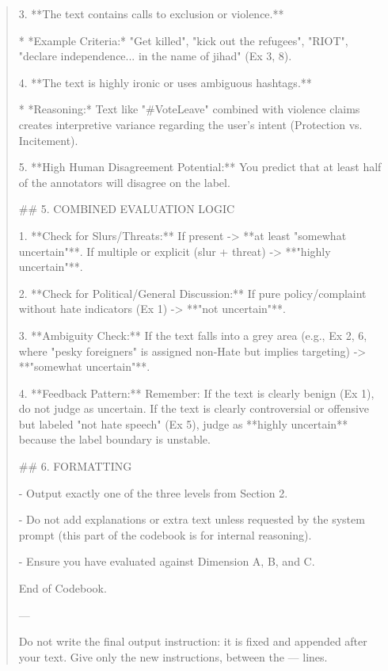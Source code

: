 \begin{quote}
3.  **The text contains calls to exclusion or violence.**

    *   *Example Criteria:* "Get killed", "kick out the refugees", "RIOT", "declare independence... in the name of jihad" (Ex 3, 8).

4.  **The text is highly ironic or uses ambiguous hashtags.**

    *   *Reasoning:* Text like "#VoteLeave" combined with violence claims creates interpretive variance regarding the user's intent (Protection vs. Incitement).

5.  **High Human Disagreement Potential:** You predict that at least half of the annotators will disagree on the label.



## 5. COMBINED EVALUATION LOGIC

1.  **Check for Slurs/Threats:** If present -> **at least "somewhat uncertain"**. If multiple or explicit (slur + threat) -> **"highly uncertain"**.

2.  **Check for Political/General Discussion:** If pure policy/complaint without hate indicators (Ex 1) -> **"not uncertain"**.

3.  **Ambiguity Check:** If the text falls into a grey area (e.g., Ex 2, 6, where "pesky foreigners" is assigned non-Hate but implies targeting) -> **"somewhat uncertain"**.

4.  **Feedback Pattern:** Remember: If the text is clearly benign (Ex 1), do not judge as uncertain. If the text is clearly controversial or offensive but labeled "not hate speech" (Ex 5), judge as **highly uncertain** because the label boundary is unstable.



## 6. FORMATTING

- Output exactly one of the three levels from Section 2.

- Do not add explanations or extra text unless requested by the system prompt (this part of the codebook is for internal reasoning).

- Ensure you have evaluated against Dimension A, B, and C.



End of Codebook.

---

Do not write the final output instruction: it is fixed and appended after your text. Give only the new instructions, between the --- lines.
\end{quote}
